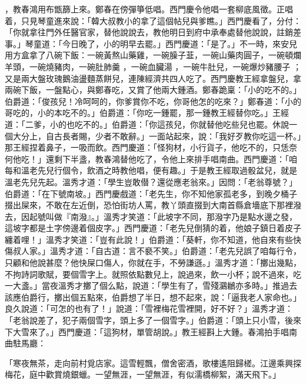 ，教春鴻用布甑篩上來。鄭春在傍彈箏低唱。西門慶令他唱一套柳底風徵。正唱着，只見琴童進來說：「韓大叔教小的拿了這個帖兒與爹瞧。」西門慶看了，分付：「你就拿往門外任醫官家，替他說說去，教他明日到府中承奉處替他說說，註銷差事。」琴童道：「今日晚了，小的明早去罷。」西門慶道：「是了。」不一時，來安兒用方盒拿了八碗下飯：一碗黃熬山藥雞，一碗臊子韮，一碗山藥肉圓子，一碗頓爛羊頭，一碗燒豬肉，一碗肚肺羹 ，一碗血臟湯 ，一碗牛肚兒，一碗爆炒豬腰子 ；又是兩大盤玫瑰鵝油盪麵蒸餅兒，連陳經濟共四人吃了。西門慶教王經拿盤兒，拿兩碗下飯，一盤點心，與鄭春吃，又賞了他兩大鍾酒。鄭春跪稟：「小的吃不的。」伯爵道：「俊孩兒！冷呵呵的，你爹賞你不吃，你哥他怎的吃來？」鄭春道：「小的哥吃的，小的本吃不的。」伯爵道：「你吃一鍾罷，那一鍾教王經替你吃。」王經道：「二爹，小的也吃不的。」伯爵道：「你這孩兒，你就替他吃些兒也罷。休說一個大分上，自古長者賜，少者不敢辭。」一面站起來，說：「我好歹教你吃這一杯。」那王經捏着鼻子，一吸而飲。西門慶道：「怪狗材，小行貨子，他吃不的，只恁奈何他吃！」還剩下半盞，教春鴻替他吃了，令他上來排手唱南曲。西門慶道：「咱每和溫老先兒行個令，飲酒之時教他唱，便有趣。」于是教王經取過骰盆兒，就是溫老先兒先起。溫秀才道：「學生豈敢僣？還從應老翁來。」因問：「老翁尊號？」伯爵道：「在下號南坡。」西門慶戲道：「老先生，你不知他家孤老多，到晚夕桶子掇出屎來，不敢在左近倒，恐怕街坊人罵，教丫頭直掇到大南首縣倉墻底下那裡潑去，因起號叫做『南潑』。」溫秀才笑道：「此坡字不同，那潑字乃是點水邊之發，這坡字都是土字傍邊着個皮字。」西門慶道：「老先兒倒猜的着，他娘子鎮日着皮子纏着哩！」溫秀才笑道：「豈有此說！」伯爵道：「葵軒，你不知道，他自來有些快傷叔人家。」溫秀才道：「自古道：言不褻不笑。」伯爵道：「老先兒誤了咱每行令，只顧和他說甚麼？他快屎口傷人，你就在手，不勞謙遜。」溫秀才道：「擲出幾點，不拘詩詞歌賦，要個雪字上。就照依點數兒上，說過來，飲一小杯；說不過來，吃一大盞。」當夜溫秀才擲了個么點，說道：「學生有了，雪殘鸂鶒亦多時。」推過去該應伯爵行，擲出個五點來，伯爵想了半日，想不起來，說：「逼我老人家命也。」良久說道：「可怎的也有了！」說道：「雪裡梅花雪裡開，好不好？」溫秀才道：「老翁說差了，犯子兩個雪字，頭上多了一個雪字。」伯爵道：「頭上只小雪，後來下大雪來了。」西門慶道：「這狗材，單管胡說。」教王經斟上大鍾。春鴻拍手唱南曲駐馬廳：

「寒夜無茶，走向前村覓店家。這雪輕飄，僧舍密酒，歌樓遙阻歸槎。江邊乘興探梅花，庭中歡賞燒銀蠟。一望無涯，一望無涯，有似濡橋柳絮，滿天飛下。」

